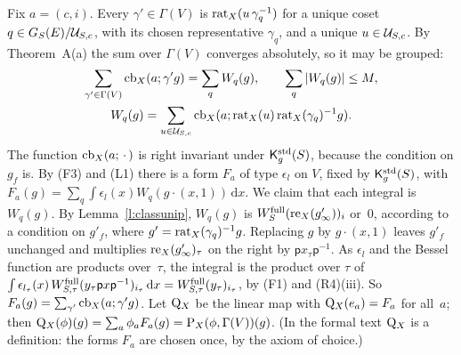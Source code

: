 \documentclass[11pt,a4paper]{article}
\makeatletter
\theoremstyle{plainx}
\theoremstyle{uprightx}
\renewenvironment{proof}[1][Proof]{\par\pushQED{\qed}\normalfont\topsep0pt\partopsep0pt
  \trivlist\item[\hskip\labelsep\itshape #1.]\ignorespaces}{\popQED\endtrivlist\@endpefalse}
\newcommand{\dd}{\mathrm{d}}
\newcommand{\Inp}[1]{\textup{(#1)}}
\makeatother
\begin{document}
\begin{proof}[Proof of Theorem A(b)]
Fix $a=(c,i)$. Every $\gamma'\in\Gamma(V)$ is $\mathrm{rat}_{X}(u\,\gamma_q^{-1})$ for a unique coset
$q\in G_{S}(E)/\mathcal{U}_{S,c}$, with its chosen representative $\gamma_q$, and a unique $u\in\mathcal{U}_{S,c}$. By
Theorem~A(a) the sum over $\Gamma(V)$ converges absolutely, so it may be grouped:
\begin{gather*}\sum_{\gamma'\in\Gamma(V)}\mathrm{cb}_{X}(a;\gamma'g)=\sum_qW_q(g),\qquad\sum_q|W_q(g)|\le M,\\
W_q(g)=\sum_{u\in\mathcal{U}_{S,c}}\mathrm{cb}_{X}(a;\mathrm{rat}_{X}(u)\,\mathrm{rat}_{X}(\gamma_q)^{-1}g).\end{gather*}
The function $\mathrm{cb}_{X}(a;\,\cdot\,)$ is right invariant under $\mathsf{K}^{\mathrm{std}}_{g}(S)$, because the condition on $g_f$ is. By (F3)
and \Inp{L1} there is a form $F_a$ of type $\epsilon_l$ on $V$, fixed by $\mathsf{K}^{\mathrm{std}}_{g}(S)$, with
$F_a(g)=\sum_q\int\epsilon_l(x)W_q(g\cdot(x,1))\,\dd x$. We claim that each integral is $W_q(g)$. By
Lemma~\ref{l:classunip}, $W_q(g)$ is $W^{\mathrm{full}}_{S}(\mathrm{re}_{X}(g'_\infty))_{i}$ or~$0$, according to a condition on
$g'_f$, where $g'=\mathrm{rat}_{X}(\gamma_q)^{-1}g$. Replacing $g$ by $g\cdot(x,1)$ leaves $g'_f$ unchanged and multiplies
$\mathrm{re}_{X}(g'_\infty)_\tau$ on the right by $\mathsf{p}x_\tau\mathsf{p}^{-1}$. As $\epsilon_l$ and the Bessel function
are products over~$\tau$, the integral is the product over $\tau$ of
$\int\epsilon_{l_\tau}(x)\,W^{\full}_{S,\tau}(y_\tau\mathsf{p}x\mathsf{p}^{-1})_{i_\tau}\,\dd x=W^{\full}_{S,\tau}(y_\tau)_{i_\tau}$,
by (F1) and \Inp{R4}(iii). So $F_a(g)=\sum_{\gamma'}\mathrm{cb}_{X}(a;\gamma'g)$. Let $\mathrm{Q}_{X}$ be the linear map with
$\mathrm{Q}_{X}(e_a)=F_a$ for all~$a$; then $\mathrm{Q}_{X}(\phi)(g)=\sum_a\phi_aF_a(g)=\mathrm{P}_{X}(\phi,\Gamma(V))(g)$. (In the
formal text $\mathrm{Q}_{X}$ is a definition: the forms $F_a$ are chosen once, by the axiom of choice.)
\end{proof}
\end{document}
